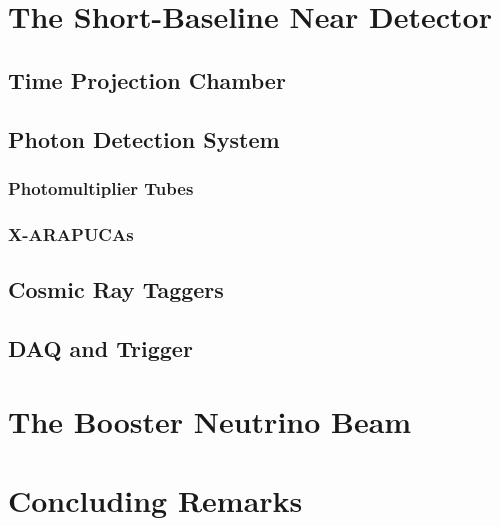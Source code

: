 \section{The Short-Baseline Near Detector}
\subsection{Time Projection Chamber}
\subsection{Photon Detection System}
\subsubsection{Photomultiplier Tubes}
\subsubsection{X-ARAPUCAs}
\subsection{Cosmic Ray Taggers}
\subsection{DAQ and Trigger}
\section{The Booster Neutrino Beam}
\section{Concluding Remarks}
